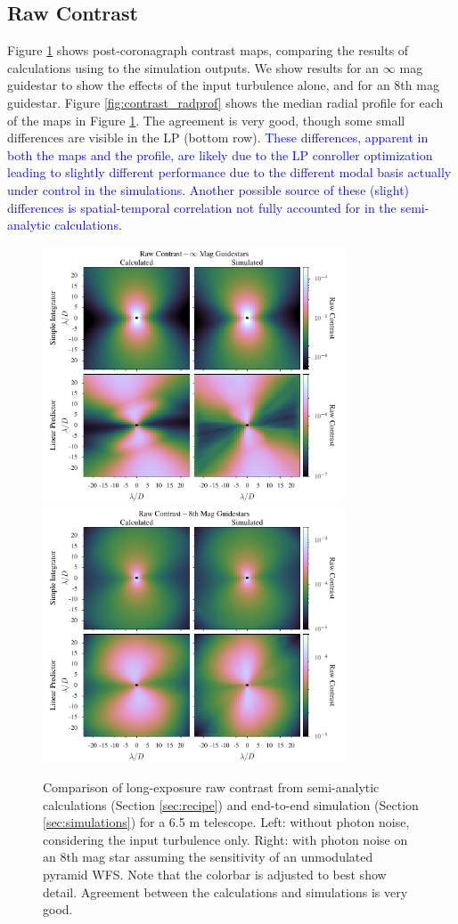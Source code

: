 \documentclass[10pt,preprint]{aastex631}
\newcommand{\jrmadd}[1]{\textcolor{blue}{#1}}
\begin{document}
\subsection{Raw Contrast}
Figure \ref{fig:contrast_2Dcomp} shows post-coronagraph contrast maps, comparing the results of calculations using \citet{2018JATIS...4a9001M} to the simulation outputs.  We show results for an $\infty$ mag guidestar to show the effects of the input turbulence alone, and for an $8$th mag guidestar.   Figure \ref{fig:contrast_radprof} shows the median radial profile for each of the maps in Figure \ref{fig:contrast_2Dcomp}.  The agreement is very good, though some small differences are visible in the LP (bottom row). \jrmadd{These differences, apparent in both the maps and the profile, are likely due to the LP conroller optimization leading to slightly different performance due to the different modal basis actually under control in the simulations. Another possible source of these (slight) differences is spatial-temporal correlation not fully accounted for in the semi-analytic calculations.}

\begin{figure}
\hspace{-0.3in}
\includegraphics[width=3.54in]{contrast0mag.pdf}
\includegraphics[width=3.54in]{contrast8mag.pdf}
\caption{Comparison of long-exposure raw contrast from semi-analytic calculations (Section \ref{sec:recipe}) and end-to-end simulation (Section \ref{sec:simulations}) for a 6.5 m telescope. Left: without photon noise, considering the input turbulence only.  Right: with photon noise on an 8th mag star assuming the sensitivity of an unmodulated pyramid WFS. Note that the colorbar is adjusted to best show detail.  Agreement between the calculations and simulations is very good.\label{fig:contrast_2Dcomp}}
\end{figure}
\end{document}

